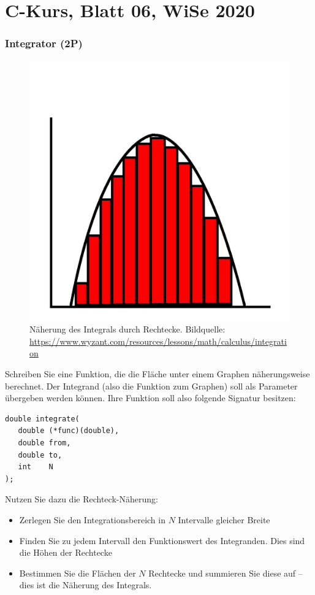 \documentclass[
	ngerman,
	fontsize=10pt,
	parskip=half,
	titlepage=true,
	DIV=12
]{scrartcl}
\begin{document}
\part*{C-Kurs, Blatt 06, WiSe 2020}

\section{Integrator (2P)}
\begin{figure}
	\vspace{-50pt}
	\includegraphics[width=\linewidth]{./integral}
	\caption{Näherung des Integrals durch Rechtecke.\newline
		Bildquelle: \url{https://www.wyzant.com/resources/lessons/math/calculus/integration}}
	\vspace{-50pt}
\end{figure}
Schreiben Sie eine Funktion, die die Fläche unter einem Graphen näherungsweise berechnet. Der Integrand (also die Funktion zum Graphen) soll als Parameter übergeben werden können. Ihre Funktion soll also folgende Signatur besitzen:
\begin{verbatim}
double integrate(
   double (*func)(double), 
   double from, 
   double to, 
   int    N
);
\end{verbatim}

Nutzen Sie dazu die Rechteck-Näherung:
\begin{itemize}
\item Zerlegen Sie den Integrationsbereich in $N$ Intervalle gleicher Breite
\item Finden Sie zu jedem Intervall den Funktionswert des Integranden. Dies sind die Höhen der Rechtecke
\item Bestimmen Sie die Flächen der $N$ Rechtecke und summieren Sie diese auf -- dies ist die Näherung des Integrals.
\end{itemize}
\end{document}
